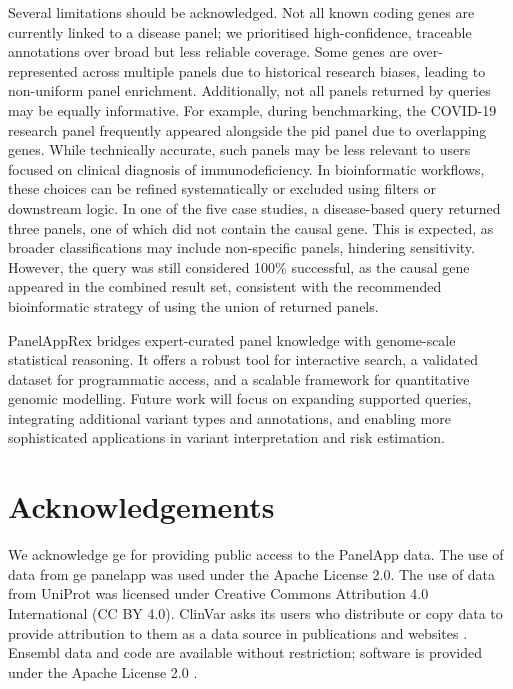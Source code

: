 Several limitations should be acknowledged. Not all known coding genes are currently linked to a disease panel; we prioritised high-confidence, traceable annotations over broad but less reliable coverage. 
Some genes are over-represented across multiple panels due to historical research biases, leading to non-uniform panel enrichment. 
Additionally, not all panels returned by queries may be equally informative. 
For example, during benchmarking, the COVID-19 research panel frequently appeared alongside the \ac{pid} panel due to overlapping genes. 
While technically accurate, such panels may be less relevant to users focused on clinical  diagnosis of immunodeficiency.
In bioinformatic workflows, these choices can be refined systematically or excluded using filters or downstream logic.
In one of the five case studies, a disease-based query returned three panels, one of which did not contain the causal gene. This is expected, as broader classifications may include non-specific panels, hindering sensitivity. However, the query was still considered 100\% successful, as the causal gene appeared in the combined result set, consistent with the recommended bioinformatic strategy of using the union of returned panels.

PanelAppRex bridges expert-curated panel knowledge with genome-scale statistical reasoning. 
It offers a robust tool for interactive search, a validated dataset for programmatic access, and a scalable framework for quantitative genomic modelling. 
Future work will focus on expanding supported queries, integrating additional variant types and annotations, and enabling more sophisticated applications in variant interpretation and risk estimation.


\section*{Acknowledgements}
\noindent
We acknowledge \ac{ge} for providing public access to the PanelApp data.
The use of data from \ac{ge} panelapp was used under the Apache License 2.0.
The use of data from UniProt was licensed under Creative Commons Attribution 4.0 International (CC BY 4.0).
ClinVar asks its users who distribute or copy data to provide attribution to them as a data source in publications and websites \cite{landrum_clinvar_2018}.
Ensembl data and code are available without restriction; software is provided under the Apache License 2.0 \cite{dyer_ensembl_2025}.


